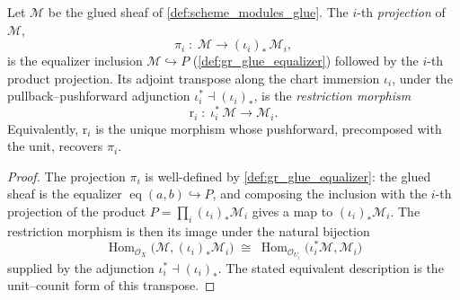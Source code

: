 \begin{lemma}\leanok
  \label{lem:glueRestrictionHom}
  Let \(\mathcal{M}\) be the glued sheaf of \cref{def:scheme_modules_glue}. The
  \(i\)-th \emph{projection} of \(\mathcal{M}\),
  \[
    \pi_i \;:\; \mathcal{M} \longrightarrow (\iota_i)_{*}\,\mathcal{M}_i,
  \]
  is the equalizer inclusion \(\mathcal{M} \hookrightarrow P\)
  (\cref{def:gr_glue_equalizer}) followed by the \(i\)-th product projection. Its
  adjoint transpose along the chart immersion \(\iota_i\), under the
  pullback--pushforward adjunction \(\iota_i^{*} \dashv (\iota_i)_{*}\), is the
  \emph{restriction morphism}
  \[
    \mathrm{r}_i \;:\; \iota_i^{*}\,\mathcal{M} \longrightarrow \mathcal{M}_i .
  \]
  Equivalently, \(\mathrm{r}_i\) is the unique morphism whose pushforward, precomposed
  with the unit, recovers \(\pi_i\).
\end{lemma}
\begin{proof}
  \leanok
  The projection \(\pi_i\) is well-defined by \cref{def:gr_glue_equalizer}: the glued
  sheaf is the equalizer \(\operatorname{eq}(a,b) \hookrightarrow P\), and composing
  the inclusion with the \(i\)-th projection of the product \(P = \prod_i
  (\iota_i)_{*}\mathcal{M}_i\) gives a map to \((\iota_i)_{*}\mathcal{M}_i\). The
  restriction morphism is then its image under the natural bijection
  \[
    \operatorname{Hom}_{\mathcal{O}_X}\bigl(\mathcal{M}, (\iota_i)_{*}\mathcal{M}_i\bigr)
      \;\cong\;
    \operatorname{Hom}_{\mathcal{O}_{U_i}}\bigl(\iota_i^{*}\mathcal{M}, \mathcal{M}_i\bigr)
  \]
  supplied by the adjunction \(\iota_i^{*} \dashv (\iota_i)_{*}\). The stated
  equivalent description is the unit--counit form of this transpose.
\end{proof}

